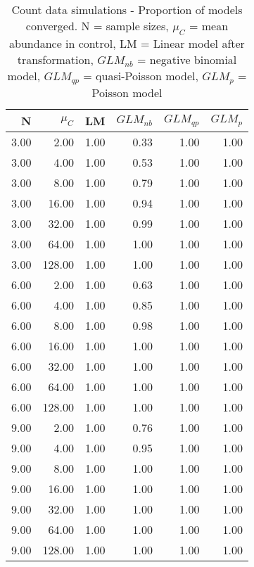 \begin{table}
\centering
\caption[Count data simulations - Proportion of models converged]{Count data simulations - Proportion of models converged. N = sample sizes, 
             $\mu_C$ = mean abundance in control, LM = Linear model after transformation, 
             $GLM_{nb}$ = negative binomial model, $GLM_{qp}$ = quasi-Poisson model, 
             $GLM_{p}$ = Poisson model} 
\label{tab:conv}
{\footnotesize
\begin{tabular}{rrrrrr}
  \hline
N & $\mu_C$ & LM & $GLM_{nb}$ & $GLM_{qp}$ & $GLM_{p}$ \\ 
  \hline
3.00 & 2.00 & 1.00 & 0.33 & 1.00 & 1.00 \\ 
  3.00 & 4.00 & 1.00 & 0.53 & 1.00 & 1.00 \\ 
  3.00 & 8.00 & 1.00 & 0.79 & 1.00 & 1.00 \\ 
  3.00 & 16.00 & 1.00 & 0.94 & 1.00 & 1.00 \\ 
  3.00 & 32.00 & 1.00 & 0.99 & 1.00 & 1.00 \\ 
  3.00 & 64.00 & 1.00 & 1.00 & 1.00 & 1.00 \\ 
  3.00 & 128.00 & 1.00 & 1.00 & 1.00 & 1.00 \\ 
  6.00 & 2.00 & 1.00 & 0.63 & 1.00 & 1.00 \\ 
  6.00 & 4.00 & 1.00 & 0.85 & 1.00 & 1.00 \\ 
  6.00 & 8.00 & 1.00 & 0.98 & 1.00 & 1.00 \\ 
  6.00 & 16.00 & 1.00 & 1.00 & 1.00 & 1.00 \\ 
  6.00 & 32.00 & 1.00 & 1.00 & 1.00 & 1.00 \\ 
  6.00 & 64.00 & 1.00 & 1.00 & 1.00 & 1.00 \\ 
  6.00 & 128.00 & 1.00 & 1.00 & 1.00 & 1.00 \\ 
  9.00 & 2.00 & 1.00 & 0.76 & 1.00 & 1.00 \\ 
  9.00 & 4.00 & 1.00 & 0.95 & 1.00 & 1.00 \\ 
  9.00 & 8.00 & 1.00 & 1.00 & 1.00 & 1.00 \\ 
  9.00 & 16.00 & 1.00 & 1.00 & 1.00 & 1.00 \\ 
  9.00 & 32.00 & 1.00 & 1.00 & 1.00 & 1.00 \\ 
  9.00 & 64.00 & 1.00 & 1.00 & 1.00 & 1.00 \\ 
  9.00 & 128.00 & 1.00 & 1.00 & 1.00 & 1.00 \\ 
   \hline
\end{tabular}
}
\end{table}
